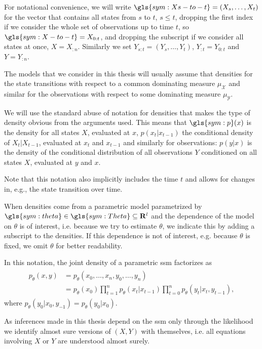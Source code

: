 For notational convenience, we will write $\gls{sym:Xs-to-t} = \left(X_s, \dots, X_{t}\right)$ for the vector that contains all states from $s$ to $t$, $s \leq t$, dropping the first index if we consider the whole set of observations up to time $t$, so $\gls{sym:X-to-t} = X_{0:t}$, and dropping the subscript if we consider all states at once, $X = X_{:n}$.
Similarly we set $Y_{s:t} = \left(Y_s, \dots, Y_{t}\right)$, $Y_{:t} = Y_{0:t}$ and $Y = Y_{:n}$.

The models that we consider in this thesis will usually assume that densities for the state transitions with respect to a common dominating measure $\mu_{\mathcal X}$ and similar for the observations with respect to some dominating measure $\mu_{\mathcal Y}$. 

\begin{notation}
    \label{not:densities}
    We will use the standard abuse of notation for densities that makes the type of density \glqq{}obvious\grqq{} from the arguments used.
    This means that $\gls{sym:p}(x)$ is the density for all states $X$, evaluated at $x$, $p(x_t|x_{t - 1})$ the conditional density of $X_t|X_{t - 1}$, evaluated at $x_{t}$ and $x_{t - 1}$ and similarly for observations: $p(y|x)$ is the density of the conditional distribution of all observations $Y$ conditioned on all states $X$, evaluated at $y$ and $x$.

    Note that this notation also implicitly includes the time $t$ and allows for changes in, e.g., the state transition over time.

    When densities come from a parametric model parametrized by $\gls{sym:theta}\in \gls{sym:Theta} \subseteq \mathbf{R}^{l}$ and the dependence of the model on $\theta$ is of interest, i.e. because we try to estimate $\theta$, we indicate this by adding a subscript to the densities.
    If this dependence is not of interest, e.g. because $\theta$ is fixed, we omit $\theta$ for better readability.

    In this notation, the joint density of a parametric \gls{ssm} factorizes as
    \begin{align}
        \label{eq:joint_density}
        \begin{split}
        p_\theta(x,y) & = p_\theta(x_0, \dots, x_{n}, y_0, \dots, y_{n})                                                              \\
                      & = p_\theta (x_0)\prod_{t = 1}^{n} p_\theta(x_{t}|x_{t - 1}) \prod_{t = 0}^{n} p_\theta(y_t | x_t, y_{t - 1}),
        \end{split}
    \end{align}
    where $p_\theta(y_0|x_0, y_{-1}) = p_\theta(y_0| x_0)$.

    As inferences made in this thesis depend on the \gls{ssm} only through the likelihood we identify almost sure versions of $(X, Y)$ with themselves, i.e. all equations involving $X$ or $Y$ are understood almost surely.
\end{notation}

